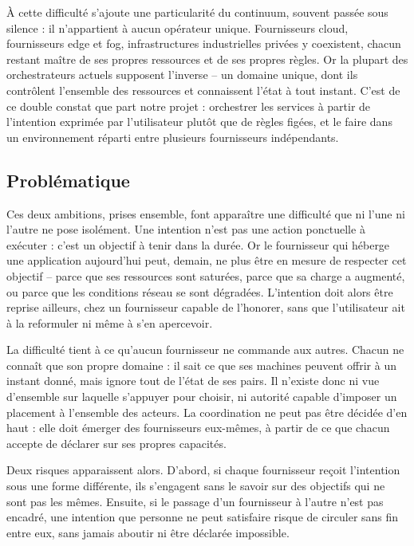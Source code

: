 À cette difficulté s'ajoute une particularité du continuum, souvent passée sous silence : il n'appartient à aucun opérateur unique. Fournisseurs cloud, fournisseurs edge et fog, infrastructures industrielles privées y coexistent, chacun restant maître de ses propres ressources et de ses propres règles. Or la plupart des orchestrateurs actuels supposent l'inverse -- un domaine unique, dont ils contrôlent l'ensemble des ressources et connaissent l'état à tout instant. C'est de ce double constat que part notre projet : orchestrer les services à partir de l'intention exprimée par l'utilisateur plutôt que de règles figées, et le faire dans un environnement réparti entre plusieurs fournisseurs indépendants.

\subsection{Problématique}
\label{sec:problematique-sub}

Ces deux ambitions, prises ensemble, font apparaître une difficulté que ni l'une ni l'autre ne pose isolément. Une intention n'est pas une action ponctuelle à exécuter : c'est un objectif à tenir dans la durée. Or le fournisseur qui héberge une application aujourd'hui peut, demain, ne plus être en mesure de respecter cet objectif -- parce que ses ressources sont saturées, parce que sa charge a augmenté, ou parce que les conditions réseau se sont dégradées. L'intention doit alors être reprise ailleurs, chez un fournisseur capable de l'honorer, sans que l'utilisateur ait à la reformuler ni même à s'en apercevoir.

La difficulté tient à ce qu'aucun fournisseur ne commande aux autres. Chacun ne connaît que son propre domaine : il sait ce que ses machines peuvent offrir à un instant donné, mais ignore tout de l'état de ses pairs. Il n'existe donc ni vue d'ensemble sur laquelle s'appuyer pour choisir, ni autorité capable d'imposer un placement à l'ensemble des acteurs. La coordination ne peut pas être décidée d'en haut : elle doit émerger des fournisseurs eux-mêmes, à partir de ce que chacun accepte de déclarer sur ses propres capacités.

Deux risques apparaissent alors. D'abord, si chaque fournisseur reçoit l'intention sous une forme différente, ils s'engagent sans le savoir sur des objectifs qui ne sont pas les mêmes. Ensuite, si le passage d'un fournisseur à l'autre n'est pas encadré, une intention que personne ne peut satisfaire risque de circuler sans fin entre eux, sans jamais aboutir ni être déclarée impossible.

